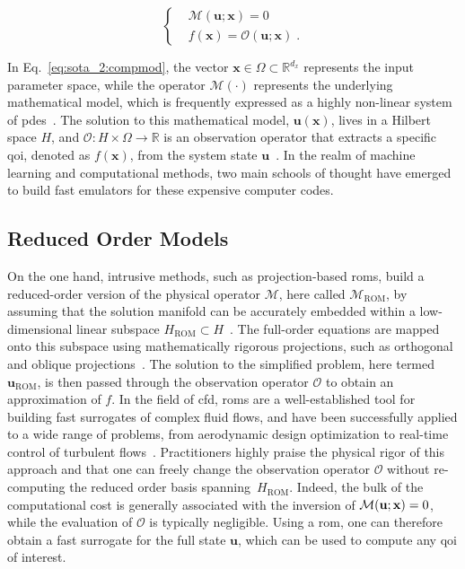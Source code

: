 \begin{equation}
\label{eq:sota_2:compmod}
\left\{ 
\begin{aligned}
&\mathcal{M}(\mathbf{u}; \mathbf{x}) = 0 \\
&f(\mathbf{x}) = \mathcal{O}(\mathbf{u}; \mathbf{x}) \;.
\end{aligned}
\right.
\end{equation}

In Eq.~\eqref{eq:sota_2:compmod}, the vector $\mathbf{x} \in \Omega \subset \mathbb{R}^{d_x}$ represents the input parameter space, while the operator $\mathcal{M}(\cdot)$ represents the underlying mathematical model, which is frequently expressed as a highly non-linear system of \glspl{pde}~\cite{quarteroni1994numerical}. The solution to this mathematical model, $\mathbf{u}(\mathbf{x})$, lives in a Hilbert space $H$, and $\mathcal{O}: H \times \Omega \rightarrow \mathbb{R}$ is an observation operator that extracts a specific \gls{qoi}, denoted as $f(\mathbf{x})$, from the system state $\mathbf{u}$~\cite{quarteroni1994numerical}. In the realm of machine learning and computational methods, two main schools of thought have emerged to build fast emulators for these expensive computer codes.

\smallskip
\subsection{Reduced Order Models}
On the one hand, intrusive methods, such as projection-based \glspl{rom}, build a reduced-order version of the physical operator $\mathcal{M}$, here called $\mathcal{M}_{\mathrm{ROM}}$, by assuming that the solution manifold can be accurately embedded within a low-dimensional linear subspace $H_{\mathrm{ROM}} \subset H$~\cite{rom_1}. The full-order equations are mapped onto this subspace using mathematically rigorous projections, such as orthogonal and oblique projections~\cite{Fick2017, FarhatOblique}. The solution to the simplified problem, here termed $\mathbf{u}_{\mathrm{ROM}}$, is then passed through the observation operator $\mathcal{O}$ to obtain an approximation of $f$. In the field of \gls{cfd}, \glspl{rom} are a well-established tool for building fast surrogates of complex fluid flows, and have been successfully applied to a wide range of problems, from aerodynamic design optimization to real-time control of turbulent flows~\cite{Ruan2026, Frahat2008, Fick2018, Manzoni2012, Chen2017}. Practitioners highly praise the physical rigor of this approach and that one can freely change the observation operator $\mathcal{O}$ without re-computing the reduced order basis spanning~$H_{\mathrm{ROM}}$. Indeed, the bulk of the computational cost is generally associated with the inversion of $\mathcal{M}(\mathbf{u}; \mathbf{x}) = 0$, while the evaluation of $\mathcal{O}$ is typically negligible. Using a \gls{rom}, one can therefore obtain a fast surrogate for the full state $\mathbf{u}$, which can be used to compute any \gls{qoi} of interest.


